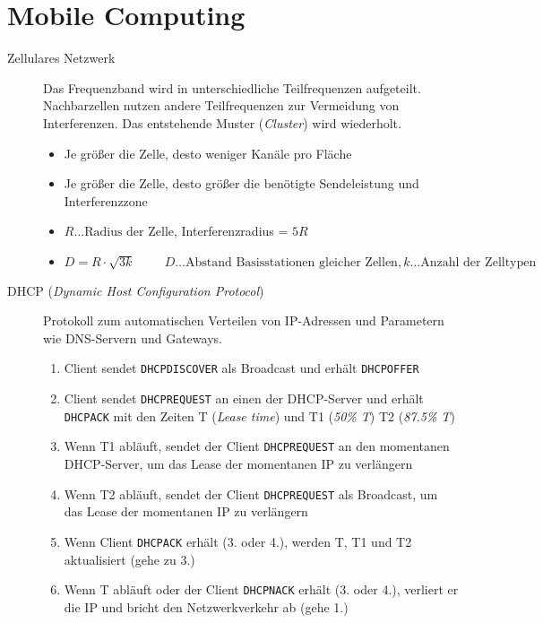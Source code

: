 \documentclass[a4paper]{article}
\newcommand{\hs}[1]{\hspace{#1}}
\begin{document}
\section{Mobile Computing}

\begin{description}
    \item[Zellulares Netzwerk]
    \begin{samepage}
    Das Frequenzband wird in unterschiedliche Teilfrequenzen aufgeteilt. Nachbarzellen nutzen andere Teilfrequenzen zur Vermeidung von Interferenzen. Das entstehende Muster (\textit{Cluster}) wird wiederholt.
    \begin{itemize}
        \item Je größer die Zelle, desto weniger Kanäle pro Fläche
        \item Je größer die Zelle, desto größer die benötigte Sendeleistung und Interferenzzone
        \item $R \ldots \text{Radius der Zelle}$, Interferenzradius = $5R$
        \item $D = R \cdot \sqrt{3k} \hs{1cm} D \ldots \text{Abstand Basisstationen gleicher Zellen}, k \ldots \text{Anzahl der Zelltypen}$
    \end{itemize}
    \end{samepage}
    \item[DHCP (\textit{Dynamic Host Configuration Protocol})]
    \begin{samepage}
    Protokoll zum automatischen Verteilen von IP-Adressen und Parametern wie DNS-Servern und Gateways.
    \begin{enumerate}
        \item Client sendet \texttt{DHCPDISCOVER} als Broadcast und erhält \texttt{DHCPOFFER}
        \item Client sendet \texttt{DHCPREQUEST} an einen der DHCP-Server und erhält \texttt{DHCPACK} mit den Zeiten T (\textit{Lease time}) und T1 (\textit{50\% T}) T2 (\textit{87.5\% T})
        \item Wenn T1 abläuft, sendet der Client \texttt{DHCPREQUEST} an den momentanen DHCP-Server, um das Lease der momentanen IP zu verlängern
        \item Wenn T2 abläuft, sendet der Client \texttt{DHCPREQUEST} als Broadcast, um das Lease der momentanen IP zu verlängern
        \item Wenn Client \texttt{DHCPACK} erhält (3. oder 4.), werden T, T1 und T2 aktualisiert (gehe zu 3.)
        \item Wenn T abläuft oder der Client \texttt{DHCPNACK} erhält (3. oder 4.), verliert er die IP und bricht den Netzwerkverkehr ab (gehe 1.)

\end{enumerate}
\end{samepage}
\end{description}
\end{document}
